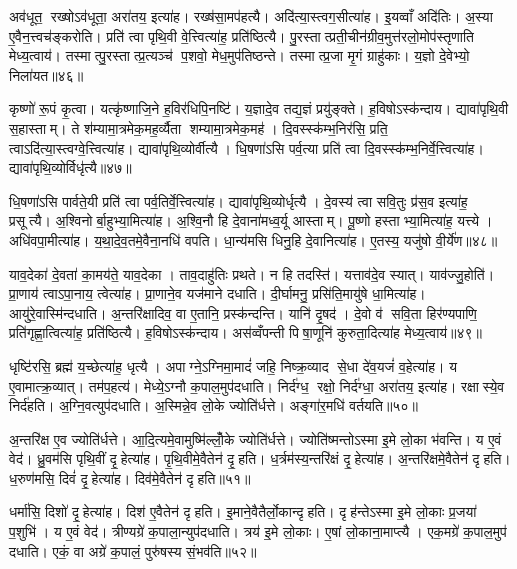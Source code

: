 अव॑धूत॒ रख्षोऽव॑धूता॒ अरा॑तय॒ इत्या॑ह। रख्ष॑सा॒मप॑हत्यै। अदि॑त्या॒स्त्वग॒सीत्या॑ह। इ॒यव्वाँ अदि॑तिः। अ॒स्या ए॒वैन॒त्त्वच॑ङ्करोति। प्रति॑ त्वा पृथि॒वी वे॒त्त्वित्या॑ह॒ प्रति॑ष्ठित्यै। पु॒रस्तात्प्रती॒चीन॑ग्रीव॒मुत्त॑रलो॒मोप॑स्तृणाति मेध्य॒त्वाय॑। तस्मात्पु॒रस्तात्प्र॒त्यञ्च॑ प॒शवो॒ मेध॒मुप॑तिष्ठन्ते। तस्मात्प्र॒जा मृ॒गं ग्राहु॑काः। य॒ज्ञो दे॒वेभ्यो॒ निला॑यत॥४६॥

कृष्णो॑ रू॒पं कृ॒त्वा। यत्कृ॑ष्णाजि॒ने ह॒विर॑धिपि॒नष्टि॑। य॒ज्ञादे॒व तद्य॒ज्ञं प्रयु॑ङ्क्ते। ह॒विषोऽस्क॑न्दाय। द्यावा॑पृथि॒वी स॒हास्ताम्। ते श॑म्यामा॒त्रमेक॒मह॒र्व्यैता शम्यामा॒त्रमेक॒मह॑। दि॒वस्स्क॑म्भ॒निर॑सि॒ प्रति॒ त्वाऽदि॑त्या॒स्त्वग्वे॒त्त्वित्या॑ह। द्यावा॑पृथि॒व्योर्वीत्यै। धि॒षणा॑ऽसि पर्व॒त्या प्रति॑ त्वा दि॒वस्स्क॑म्भ॒निर्वे॒त्त्वित्या॑ह। द्यावा॑पृथि॒व्योर्विधृ॑त्यै॥४७॥

धि॒षणा॑ऽसि पार्वते॒यी प्रति॑ त्वा पर्व॒तिर्वे॒त्त्वित्या॑ह। द्यावा॑पृथि॒व्योर्धृत्यै। दे॒वस्य॑ त्वा सवि॒तुः प्र॑स॒व इत्या॑ह॒ प्रसूत्यै। अ॒श्विनोर्बा॒हुभ्या॒मित्या॑ह। अ॒श्वि॒नौ हि दे॒वाना॑मध्व॒र्यू आस्ताम्। पू॒ष्णो हस्ताभ्या॒मित्या॑ह॒ यत्त्ये। अधि॑वपा॒मीत्या॑ह। य॒था॒दे॒व॒तमे॒वैना॒नधि॑ वपति। धा॒न्य॑मसि धिनु॒हि दे॒वानित्या॑ह। ए॒तस्य॒ यजु॑षो वी॒र्ये॑ण॥४८॥

याव॒देका॑ दे॒वता॑ का॒मय॑ते॒ याव॒देका। ताव॒दाहु॑तिः प्रथते। न हि तदस्ति॑। यत्ताव॑दे॒व स्यात्। याव॑ज्जु॒होति॑। प्रा॒णाय॑ त्वाऽपा॒नाय॒ त्वेत्या॑ह। प्रा॒णाने॒व यज॑माने दधाति। दी॒र्घामनु॒ प्रसि॑ति॒मायु॑षे धा॒मित्या॑ह। आयु॑रे॒वास्मि॑न्दधाति। अ॒न्तरि॑क्षादिव॒ वा ए॒तानि॒ प्रस्क॑न्दन्ति। यानि॑ दृ॒षद॑। दे॒वो व॑ सवि॒ता हिर॑ण्यपाणि॒ प्रति॑गृह्णा॒त्वित्या॑ह॒ प्रति॑ष्ठित्यै। ह॒विषोऽस्क॑न्दाय। अस॑व्वँपन्ती पिषा॒णूनि॑ कुरुता॒दित्या॑ह मेध्य॒त्वाय॑॥४९॥\anuvakamend[निला॑यत॒ विधृ॑त्यै वी॒र्ये॑ण स्कन्दन्ति च॒त्वारि॑ च]

धृष्टि॑रसि॒ ब्रह्म॑ य॒च्छेत्या॑ह॒ धृत्यै। अपाग्ने॒ऽग्निमा॒मादं॑ जहि॒ निष्क्र॒व्याद से॒धा दे॑व॒यजं॑ व॒हेत्या॑ह। य ए॒वामात्क्र॒व्यात्। तम॑प॒हत्य॑। मेध्ये॒ऽग्नौ क॒पाल॒मुप॑दधाति। निर्द॑ग्ध॒ रक्षो॒ निर्द॑ग्धा॒ अरा॑तय॒ इत्या॑ह। रक्षास्ये॒व निर्द॑हति। अ॒ग्नि॒वत्युप॑दधाति। अ॒स्मिन्ने॒व लो॒के ज्योति॑र्धत्ते। अङ्गा॑र॒मधि॑ वर्तयति॥५०॥

अ॒न्तरि॑क्ष ए॒व ज्योति॑र्धत्ते। आ॒दि॒त्यमे॒वामुष्मि॑ल्लोँ॒के ज्योति॑र्धत्ते। ज्योति॑ष्मन्तोऽस्मा इ॒मे लो॒का भ॑वन्ति। य ए॒वं वेद॑। ध्रु॒वम॑सि पृथि॒वीं दृ॒हेत्या॑ह। पृ॒थि॒वीमे॒वैतेन॑ दृ॒हति। ध॒र्त्रम॑स्य॒न्तरि॑क्षं दृ॒हेत्या॑ह। अ॒न्तरि॑क्षमे॒वैतेन॑ दृहति। ध॒रुण॑मसि॒ दिवं॑ दृ॒हेत्या॑ह। दिव॑मे॒वैतेन॑ दृहति॥५१॥

धर्मा॑सि॒ दिशो॑ दृ॒हेत्या॑ह। दिश॑ ए॒वैतेन॑ दृहति। इ॒माने॒वैतैर्लो॒कान्दृहति। दृह॑न्तेऽस्मा इ॒मे लो॒काः प्र॒जया॑ प॒शुभि॑। य ए॒वं वेद॑। त्रीण्यग्रे॑ क॒पाला॒न्युप॑दधाति। त्रय॑ इ॒मे लो॒काः। ए॒षां लो॒काना॒माप्त्यै। एक॒मग्रे॑ क॒पाल॒मुप॑ दधाति। एकं॒ वा अग्रे॑ क॒पालं॒ पुरु॑षस्य सं॒भव॑ति॥५२॥

